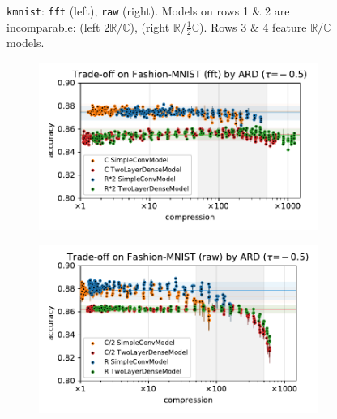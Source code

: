 \documentclass[a4paper,10pt,onecolumn]{article}
\newcommand{\real}{\mathbb{R}}
\newcommand{\cplx}{\mathbb{C}}
\begin{document}
\begin{figure}[b]
\begin{subfigure}[b]{0.5\columnwidth}
  \end{subfigure}
  \caption{%
    \texttt{kmnist}:
      \texttt{fft} (left), \texttt{raw} (right).
      Models on rows 1 \& 2 are incomparable: (left $2\real / \cplx$), (right $\real / \tfrac12\cplx$).
      Rows 3 \& 4 feature $\real / \cplx$ models.
  }
\end{figure}

\begin{figure}[b]
  \centering
  \begin{subfigure}[b]{0.5\columnwidth}
    \centering
    \includegraphics[width=\columnwidth]{figure__mnist-like__trade-off/appendix__cmp__ARD__fashionmnist__fft__-0.5.pdf}
  \end{subfigure}%
  \begin{subfigure}[b]{0.5\columnwidth}
    \centering
    \includegraphics[width=\columnwidth]{figure__mnist-like__trade-off/appendix__cmp__ARD__fashionmnist__raw__-0.5.pdf}

\end{subfigure}
\end{figure}
\end{document}

